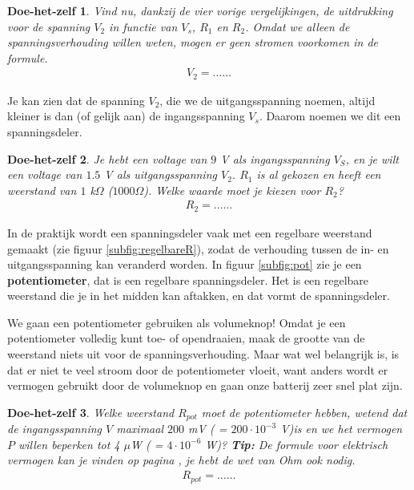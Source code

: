 \documentclass{article}
\newtheorem{DIY}{Doe-het-zelf}
\begin{document}
			\begin{DIY} Vind nu, dankzij de vier vorige vergelijkingen, de uitdrukking voor de spanning $V_2$ in functie van $V_s$, $R_1$ en $R_2$. Omdat we alleen de spanningsverhouding willen weten, mogen er geen stromen voorkomen in de formule.
			\begin{align*}
			    V_2 = \ldots\ldots
			\end{align*}
			\end{DIY}
			Je kan zien dat de spanning $V_2$, die we de uitgangsspanning noemen, altijd kleiner is dan (of gelijk aan) de ingangsspanning $V_s$. Daarom noemen we dit een spanningsdeler.
			\begin{DIY}Je hebt een voltage van $9$ V als ingangsspanning $V_S$, en je wilt een voltage van $1.5$ V als uitgangsspanning $V_2$. $R_1$ is al gekozen en heeft een weerstand van $1$ k$\Omega$ ($1000 \Omega$). Welke waarde moet je kiezen voor $R_2$?
			\begin{align*}
			    R_2 = \ldots\ldots
			\end{align*}
			\end{DIY}
			In de praktijk wordt een spanningsdeler vaak met een regelbare weerstand gemaakt (zie figuur \ref{subfig:regelbareR}), zodat de verhouding tussen de in- en uitgangsspanning kan veranderd worden. In figuur \ref{subfig:pot} zie je een \textbf{potentiometer}, dat is een regelbare spanningsdeler. Het is een regelbare weerstand die je in het midden kan aftakken, en dat vormt de spanningsdeler.

			We gaan een potentiometer gebruiken als volumeknop! Omdat je een potentiometer volledig kunt toe- of opendraaien, maak de grootte van de weerstand niets uit voor de spanningsverhouding. Maar wat wel belangrijk is, is dat er niet te veel stroom door de potentiometer vloeit, want anders wordt er vermogen gebruikt door de volumeknop en gaan onze batterij zeer snel plat zijn. 

			\begin{DIY} Welke weerstand $R_{pot}$ moet de potentiometer hebben, wetend dat de ingangsspanning $V$ maximaal $200$ mV ( = $200 \cdot 10^{-3}$ V)is en we het vermogen $P$ willen beperken tot 4 $\mu$W ( = $4 \cdot 10^{-6}$ W)? \textbf{Tip:} De formule voor elektrisch vermogen kan je vinden op pagina \pageref{eq:vermogen},  je hebt de wet van Ohm ook nodig.
			\begin{align*}
			    R_{pot} = \ldots\ldots
			\end{align*}
			\end{DIY}			
\end{document}
